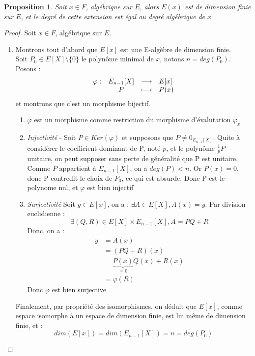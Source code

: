 \documentclass[a4paper,12pt,french]{report}
\newtheorem{proposition}{Proposition}[section]
\begin{document}
			\begin{proposition}
				Soit \(x \in F \), algébrique sur \(E\), alors \(E(x)\) est de dimension finie sur \(E\), et le degré de cette extension est égal au degré algébrique de \(x\){}
			\end{proposition}
				\begin{proof}
					Soit \(x \in F \), algébrique sur \(E\).{}
					
	\begin{enumerate}
		\item Montrons tout d'abord que $E[x]$ est une E-algèbre de dimension finie.\\ 
						Soit \(P_{0} \in E[X]\setminus\{0\} \) le polynôme minimal de $x$, notons \(n = deg(P_{0})\).
					Posons : 
					\[{}
						\begin{array}[t]{lccl}
							\varphi : 
							& E_{n-1}[X] & \longrightarrow & E[x] \\
							& P & \longmapsto & P(x)
						\end{array}
					\] et montrons que c'est un morphisme bijectif.
					
					\begin{enumerate}
						\item $\varphi$ est un morphisme comme restriction du morphisme d'évalutation $\varphi_{x}$
						\item \emph{Injectivité} - Soit \(P \in Ker(\varphi)\) et supposons que \(P \neq 0_{E_{{n_-1}}[X]} \). Quite à considérer le coefficient dominant de P, noté \(p\), et le polynôme \(\frac{1}{p}P\) unitaire, on peut supposer sans perte de généralité que P est unitaire. Comme \(P\) appartient à \(E_{n-1}[X]\), on a \(deg(P) < n\). Or \(P(x) = 0\), donc P contredit le choix de \(P_{0}\), ce qui est absurde. Donc P est le polynome nul, et \(\varphi\) est bien injectif
						
						\item \emph{Surjectivité}
						Soit $y \in E[x]$, on a : $\exists A \in E[X], A(x) = y$. Par division euclidienne : 
						\[{}
							\exists (Q,R) \in E[X] \times E_{n-1}[X] , A = PQ + R
						\]
						Donc, on a :
						\[{}
						\begin{aligned}
							y &= A(x) \\
							&= (PQ + R)(x)\\
							&=\underbrace{P(x)}_{=0}Q(x) + R(x)\\
							&=\varphi(R)
						\end{aligned}
						\]
						Donc $\varphi$ est bien surjective
					\end{enumerate}
				Finalement, par propriété des isomorphismes, on déduit que $E[x]$, comme espace isomorphe à un espace de dimension finie, est lui même de dimension finie, et :
				\[{}
				dim(E[x]) = dim(E_{n-1}[X]) = n = deg(P_{0})
				\]
		

\end{enumerate}
\end{proof}
\end{document}
